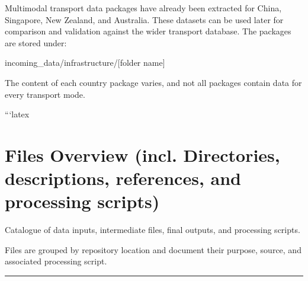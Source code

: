 \documentclass[11pt,a4paper]{article}
\begin{document}
Multimodal transport data packages have already been extracted for China, Singapore, New Zealand, and Australia. These datasets can be used later for comparison and validation against the wider transport database. The packages are stored under:\par

incoming\_data/infrastructure/[folder name]\par

The content of each country package varies, and not all packages contain data for every transport mode.\par

```latex
\section{Files Overview (incl. Directories, descriptions, references, and processing scripts)}

Catalogue of data inputs, intermediate files, final outputs, and processing scripts.

\vspace{0.6em}

\noindent
Files are grouped by repository location and document their purpose,
source, and associated processing script.

\vspace{0.5em}

\noindent
\textcolor{ruleblue}{\rule{\textwidth}{0.6pt}}

\vspace{0.4em}

\begingroup
\small

\renewcommand{\medskip}{%
    \par\vspace{0.7em}%
    \noindent\textcolor{ruleblue}{\rule{\textwidth}{0.35pt}}%
    \par\vspace{0.3em}%
}
\end{document}
